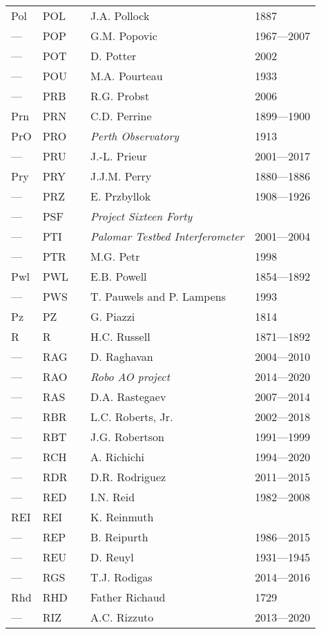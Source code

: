 \begin{longtable}{l|l|c|p{59mm}|l}
Pol & POL &   & J.A. Pollock & 1887 \\
--- & POP &   & G.M. Popovic & 1967---2007 \\
--- & POT &   & D. Potter & 2002 \\
--- & POU &   & M.A. Pourteau & 1933 \\
--- & PRB &   & R.G. Probst & 2006 \\
Prn & PRN &   & C.D. Perrine & 1899---1900 \\
PrO & PRO &   & \emph{Perth Observatory} & 1913 \\
--- & PRU &   & J.-L. Prieur & 2001---2017 \\
Pry & PRY &   & J.J.M. Perry & 1880---1886 \\
--- & PRZ &   & E. Przbyllok & 1908---1926 \\
--- & PSF &   & \emph{Project Sixteen Forty} & \\
--- & PTI &   & \emph{Palomar Testbed Interferometer} & 2001---2004 \\
--- & PTR &   & M.G. Petr & 1998 \\
Pwl & PWL &   & E.B. Powell & 1854---1892 \\
--- & PWS &   & T. Pauwels and P. Lampens & 1993 \\
Pz  & PZ  &   & G. Piazzi & 1814 \\\midrule
R   & R   &   & H.C. Russell & 1871---1892 \\
--- & RAG &   & D. Raghavan & 2004---2010 \\
--- & RAO &   & \emph{Robo AO project} & 2014---2020 \\
--- & RAS &   & D.A. Rastegaev & 2007---2014 \\
--- & RBR &   & L.C. Roberts, Jr. & 2002---2018 \\
--- & RBT &   & J.G. Robertson & 1991---1999 \\
--- & RCH &   & A. Richichi & 1994---2020 \\
--- & RDR &   & D.R. Rodriguez & 2011---2015 \\
--- & RED &   & I.N. Reid & 1982---2008 \\
REI & REI &   & K. Reinmuth & \\
--- & REP &   & B. Reipurth & 1986---2015 \\
--- & REU &   & D. Reuyl & 1931---1945 \\
--- & RGS &   & T.J. Rodigas & 2014---2016 \\
Rhd & RHD &   & Father Richaud & 1729 \\
--- & RIZ &   & A.C. Rizzuto & 2013---2020 \\

\end{longtable}
